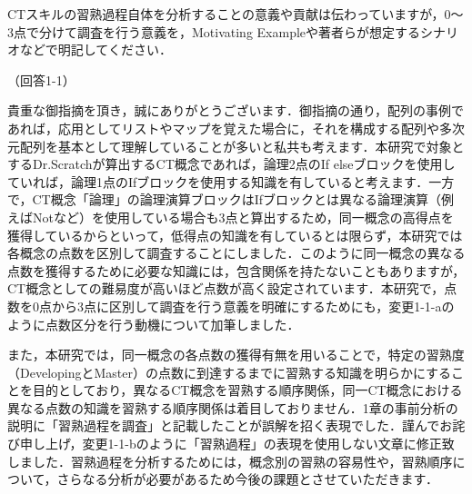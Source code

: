\documentclass{jarticle} %
\def\subsection#1{ \vspace{1pc} {\gt #1} }
\begin{document}
CTスキルの習熟過程自体を分析することの意義や貢献は伝わっていますが，0〜3点で分けて調査を行う意義を，Motivating Exampleや著者らが想定するシナリオなどで明記してください．

\subsection{（回答1-1）}

貴重な御指摘を頂き，誠にありがとうございます．御指摘の通り，配列の事例であれば，応用としてリストやマップを覚えた場合に，それを構成する配列や多次元配列を基本として理解していることが多いと私共も考えます．本研究で対象とするDr.Scratchが算出するCT概念であれば，論理2点のIf elseブロックを使用していれば，論理1点のIfブロックを使用する知識を有していると考えます．一方で，CT概念「論理」の論理演算ブロックはIfブロックとは異なる論理演算（例えばNotなど）を使用している場合も3点と算出するため，同一概念の高得点を獲得しているからといって，低得点の知識を有しているとは限らず，本研究では各概念の点数を区別して調査することにしました．このように同一概念の異なる点数を獲得するために必要な知識には，包含関係を持たないこともありますが，CT概念としての難易度が高いほど点数が高く設定されています．本研究で，点数を0点から3点に区別して調査を行う意義を明確にするためにも，変更1-1-aのように点数区分を行う動機について加筆しました．

また，本研究では，同一概念の各点数の獲得有無を用いることで，特定の習熟度（DevelopingとMaster）の点数に到達するまでに習熟する知識を明らかにすることを目的としており，異なるCT概念を習熟する順序関係，同一CT概念における異なる点数の知識を習熟する順序関係は着目しておりません．1章の事前分析の説明に「習熟過程を調査」と記載したことが誤解を招く表現でした．謹んでお詫び申し上げ，変更1-1-bのように「習熟過程」の表現を使用しない文章に修正致しました．習熟過程を分析するためには，概念別の習熟の容易性や，習熟順序について，さらなる分析が必要があるため今後の課題とさせていただきます．

\newpage
\end{document}
